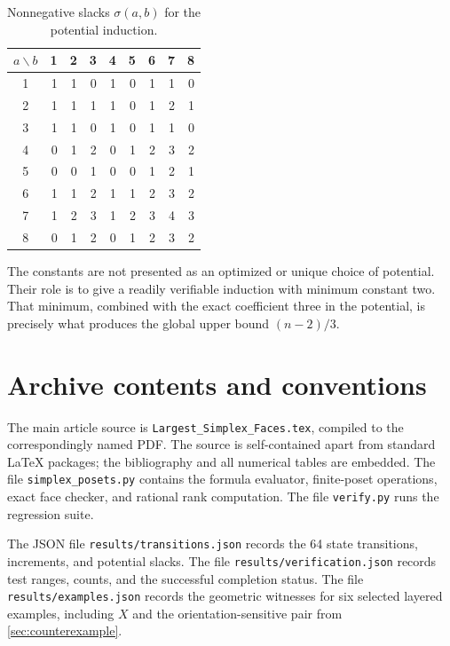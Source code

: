 \documentclass[11pt]{article}
\theoremstyle{definition}
\begin{document}
\begin{table}[htbp]
\centering
\caption{Nonnegative slacks $\sigma(a,b)$ for the potential induction.}\label{tab:slacks}
\renewcommand{\arraystretch}{1.2}
\begin{tabular}{c|rrrrrrrr}
\toprule
$a\backslash b$ &1&2&3&4&5&6&7&8\\
\midrule
1 & 1 & 1 & 0 & 1 & 0 & 1 & 1 & 0\\
2 & 1 & 1 & 1 & 1 & 0 & 1 & 2 & 1\\
3 & 1 & 1 & 0 & 1 & 0 & 1 & 1 & 0\\
4 & 0 & 1 & 2 & 0 & 1 & 2 & 3 & 2\\
5 & 0 & 0 & 1 & 0 & 0 & 1 & 2 & 1\\
6 & 1 & 1 & 2 & 1 & 1 & 2 & 3 & 2\\
7 & 1 & 2 & 3 & 1 & 2 & 3 & 4 & 3\\
8 & 0 & 1 & 2 & 0 & 1 & 2 & 3 & 2\\
\bottomrule
\end{tabular}
\end{table}

The constants are not presented as an optimized or unique choice of potential. Their role is to give a readily verifiable induction with minimum constant two. That minimum, combined with the exact coefficient three in the potential, is precisely what produces the global upper bound $(n-2)/3$.

\section{Archive contents and conventions}\label{app:archive}
The main article source is \texttt{Largest\_Simplex\_Faces.tex}, compiled to the correspondingly named PDF. The source is self-contained apart from standard LaTeX packages; the bibliography and all numerical tables are embedded. The file \texttt{simplex\_posets.py} contains the formula evaluator, finite-poset operations, exact face checker, and rational rank computation. The file \texttt{verify.py} runs the regression suite.

The JSON file \texttt{results/transitions.json} records the 64 state transitions, increments, and potential slacks. The file \texttt{results/verification.json} records test ranges, counts, and the successful completion status. The file \texttt{results/examples.json} records the geometric witnesses for six selected layered examples, including $X$ and the orientation-sensitive pair from \cref{sec:counterexample}.
\end{document}
